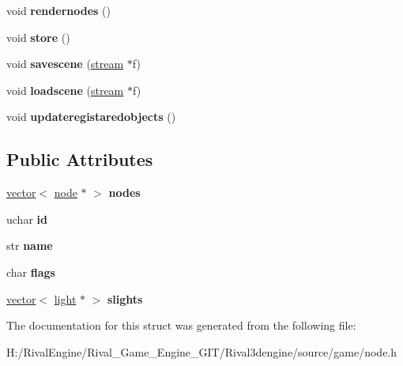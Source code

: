 \begin{DoxyCompactItemize}
\item 
\mbox{\label{structscenegraph_a25345072c1d745bf2759ba3c2c316dce}} 
void {\bfseries rendernodes} ()
\item 
\mbox{\label{structscenegraph_a0b1435b00e8eb74e21bd592d2d81d54f}} 
void {\bfseries store} ()
\item 
\mbox{\label{structscenegraph_a2fbeff5118a3ee8fb94c40947d026f69}} 
void {\bfseries savescene} (\hyperlink{structstream}{stream} $\ast$f)
\item 
\mbox{\label{structscenegraph_a4a1beb72562017d8c9ccf154e30af020}} 
void {\bfseries loadscene} (\hyperlink{structstream}{stream} $\ast$f)
\item 
\mbox{\label{structscenegraph_ae44a4eedda46f984988592b4737f8b1a}} 
void {\bfseries updateregistaredobjects} ()
\end{DoxyCompactItemize}
\subsection*{Public Attributes}
\begin{DoxyCompactItemize}
\item 
\mbox{\label{structscenegraph_a7523d7f11d221342284b897bdf243e18}} 
\hyperlink{structvector}{vector}$<$ \hyperlink{structnode}{node} $\ast$ $>$ {\bfseries nodes}
\item 
\mbox{\label{structscenegraph_a7abcbae7af14140860501ff3a89e9de8}} 
uchar {\bfseries id}
\item 
\mbox{\label{structscenegraph_aa7fc61a23ad82e9d3d3ddd90bc021b36}} 
str {\bfseries name}
\item 
\mbox{\label{structscenegraph_aaf5ee177302ab9777a5a91eb826f3b68}} 
char {\bfseries flags}
\item 
\mbox{\label{structscenegraph_a4ea08bf05a83c43daee50a910009ac4d}} 
\hyperlink{structvector}{vector}$<$ \hyperlink{structlight}{light} $\ast$ $>$ {\bfseries slights}
\end{DoxyCompactItemize}


The documentation for this struct was generated from the following file\+:\begin{DoxyCompactItemize}
\item 
H\+:/\+Rival\+Engine/\+Rival\+\_\+\+Game\+\_\+\+Engine\+\_\+\+G\+I\+T/\+Rival3dengine/source/game/node.\+h\end{DoxyCompactItemize}
